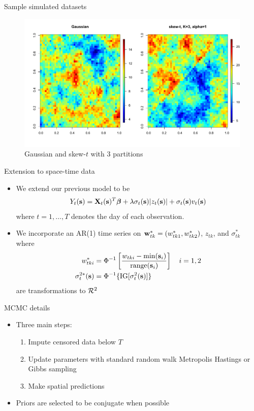 \documentclass{beamer}
\begin{document}
\begin{frame}{Sample simulated datasets}
  \centering
  \begin{figure}
  \includegraphics[width=1\linewidth]{./plots/pot/gauss-vs-skew-t3.pdf}
  \caption{Gaussian and skew-$t$ with 3 partitions}
  \end{figure}
\end{frame}

\begin{frame}{Extension to space-time data}
  \begin{itemize} \setlength{\itemsep}{0.5em}
    \item We extend our previous model to be
    \begin{align*}
      Y_t(\mbox{\bf s}) = \mbox{\bf X}_t(\mbox{\bf s})^T \mbox{\boldmath $\beta$} + \lambda \sigma_t(\mbox{\bf s}) | z_t(\mbox{\bf s}) | + \sigma_t(\mbox{\bf s}) v_t(\mbox{\bf s})
    \end{align*}
    where $t = 1, \ldots, T$ denotes the day of each observation.
    \item We incorporate an AR(1) time series on $\mbox{\bf w}^*_{tk} = (w^*_{tk1}, w^*_{tk2})$, $z_{tk}$, and $\sigma^*_{tk}$ where
    \begin{align*}
      w^*_{tki} &= \Phi^{-1}\left[ \frac{w_{tki} - \min(\mbox{\bf s}_i)}{ \text{range}(\mbox{\bf s}_i)}\right] \quad i = 1, 2 \\
      \sigma^{2*}_t(\mbox{\bf s}) &= \Phi^{-1}\{ \text{IG}[\sigma^2_t(\mbox{\bf s})] \}
    \end{align*}
    are transformations to ${\cal R}^2$
  \end{itemize}
\end{frame}

\begin{frame}{MCMC details}
  \begin{itemize} \setlength{\itemsep}{0.5em}
    \item Three main steps:
    \begin{enumerate}[1.]
      \item Impute censored data below $T$
      \item Update parameters with standard random walk Metropolis Hastings or Gibbs sampling
      \item Make spatial predictions
    \end{enumerate}
    \item Priors are selected to be conjugate when possible
  \end{itemize}
\end{frame}
\end{document}
